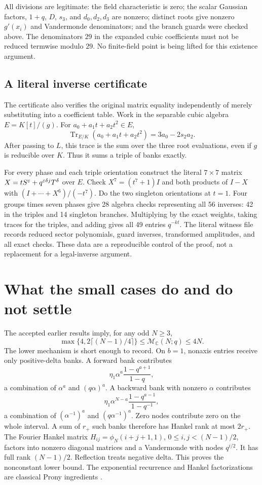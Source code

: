 \documentclass[11pt,letterpaper]{article}
\theoremstyle{definition}\newtheorem{definition}[theorem]{Definition}
\newcommand{\C}{\mathbb C}\newcommand{\Q}{\mathbb Q}\newcommand{\Z}{\mathbb Z}
\newcommand{\M}{\mathcal M}
\begin{document}
All divisions are legitimate: the field characteristic is zero; the scalar Gaussian factors, $1+q$, $D$, $s_3$, and $d_0,d_2,d_3$ are nonzero; distinct roots give nonzero $g'(x_i)$ and Vandermonde denominators; and the branch guards were checked above. The denominators $29$ in the expanded cubic coefficients must not be reduced termwise modulo $29$. No finite-field point is being lifted for this existence argument.

\subsection{A literal inverse certificate}

The certificate also verifies the original matrix equality independently of merely substituting into a coefficient table. Work in the separable cubic algebra $E=K[t]/(g)$. For $a_0+a_1t+a_2t^2\in E$,
\[
 \operatorname{Tr}_{E/K}(a_0+a_1t+a_2t^2)=3a_0-2s_2a_2.
\]
After passing to $L$, this trace is the sum over the three root evaluations, even if $g$ is reducible over $K$. Thus it sums a triple of banks exactly.

For every phase and each triple orientation construct the literal $7\times7$ matrix $X=tS^\varepsilon+q^{\varepsilon\delta j}T^\delta$ over $E$. Check $X^7=(t^7+1)I$ and both products of $I-X$ with $(I+\cdots+X^6)/(-t^7)$. Do the two singleton orientations at $t=1$. Four groups times seven phases give 28 algebra checks representing all 56 inverses: 42 in the triples and 14 singleton branches. Multiplying by the exact weights, taking traces for the triples, and adding gives all 49 entries $q^{-kt}$. The literal witness file records reduced sector polynomials, guard inverses, transformed amplitudes, and all exact checks. These data are a reproducible control of the proof, not a replacement for a legal-inverse argument.

\section{What the small cases do and do not settle}\label{sec:general}

The accepted earlier results imply, for any odd $N\geq3$,
\begin{equation}\label{eq:generalbound}
 \max\{4,2\lceil(N-1)/4\rceil\}\leq\M_{\C}(N;q)\leq4N.
\end{equation}
The lower mechanism is short enough to record. On $b=1$, nonaxis entries receive only positive-delta banks. A forward bank contributes
\[
 \eta_1\alpha^a\frac{1-q^{a+1}}{1-q},
\]
a combination of $\alpha^a$ and $(q\alpha)^a$. A backward bank with nonzero $\alpha$ contributes
\[
 \eta_1\alpha^{N-a}\frac{1-q^{a-1}}{1-q^{-1}},
\]
a combination of $(\alpha^{-1})^a$ and $(q\alpha^{-1})^a$. Zero nodes contribute zero on the whole interval. A sum of $r_+$ such banks therefore has Hankel rank at most $2r_+$. The Fourier Hankel matrix $H_{ij}=\phi_N(i+j+1,1)$, $0\leq i,j<(N-1)/2$, factors into nonzero diagonal matrices and a Vandermonde with nodes $q^{i/2}$. It has full rank $(N-1)/2$. Reflection treats negative delta. This proves the nonconstant lower bound. The exponential recurrence and Hankel factorizations are classical Prony ingredients \cite[Section 2]{PottsTasche}\cite[Theorem 2.1]{PeterPlonka}.
\end{document}
